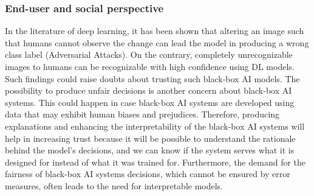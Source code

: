 \subsubsection*{End-user and social perspective}
In the literature of deep learning, it has been shown that altering an image such that humans cannot observe the change can lead the model in producing a wrong class label (Adversarial Attacks). 
On the contrary, completely unrecognizable images to humans can be recognizable with high confidence using DL models.
Such findings could raise doubts about trusting such black-box AI models. 
The possibility to produce unfair decisions is another concern about black-box AI systems. 
This could happen in case black-box AI systems are developed using data that may exhibit human biases and prejudices.
Therefore, producing explanations and enhancing the interpretability of the black-box AI systems will help in increasing trust because it will be possible to understand the rationale behind the model's decisions, and we can know if
the system serves what it is designed for instead of what it was trained for. Furthermore, the demand for the fairness of black-box AI systems decisions, which cannot be ensured by error measures, often leads to the need for
interpretable models.

